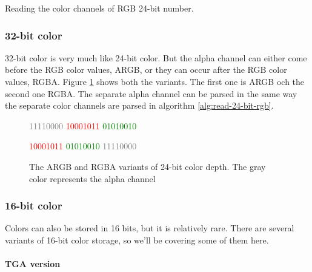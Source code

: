\begin{refsection}

  \begin{algorithm}[H]
    \caption{Reading the color channels of RGB 24-bit number.}
    \label{alg:read-24-bit-rgb}
    \begin{algorithmic}[1]
    \end{algorithmic}
  \end{algorithm}

  \subsubsection{32-bit color}

  32-bit color is very much like 24-bit color. But the alpha channel
  can either come before the RGB color values, ARGB, or
  they can occur after the RGB color values, RGBA. Figure
  \ref{fig:32-bit-colors-bits} shows both the variants. The first one
  is ARGB och the second one RGBA. The separate alpha channel can be
  parsed in the same way the separate color channels are parsed in
  algorithm \ref{alg:read-24-bit-rgb}.

  \begin{figure}
    \centering
    {\Large%
      \textcolor{gray}{11110000}%
      \textcolor{red}{10001011}%
      \textcolor{green}{01010010}%
      \textcolor{blue}{\fullbyte}

      \textcolor{red}{10001011}%
      \textcolor{green}{01010010}%
      \textcolor{blue}{\fullbyte}%
      \textcolor{gray}{11110000}%
    }

    \caption{The ARGB and RGBA variants of 24-bit color depth. The
      gray color represents the alpha channel }
    \label{fig:32-bit-colors-bits}
  \end{figure}

  \subsubsection{16-bit color}

  Colors can also be stored in 16 bits, but it is relatively
  rare. There are several variants of 16-bit color storage, so we'll
  be covering some of them here.

  \paragraph{TGA version}


\end{refsection}
